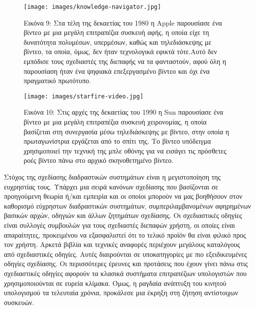 \documentclass[
]{article}
\begin{document}
\leavevmode{}%
\begin{figure}
\hypertarget{fig:knowledge-navigator}{%
\centering
\texttt{[image: images/knowledge-navigator.jpg]}
\caption{Εικόνα 9: Στα τέλη της δεκαετίας του 1980 η Apple παρουσίασε
ένα βίντεο με μια μεγάλη επιτραπέζια συσκευή αφής, η οποία είχε τη
δυνατότητα πολυμέσων, υπερμέσων, καθώς και τηλεδιάσκεψης με βίντεο, τα
οποία, όμως, δεν ήταν τεχνολογικά εφικτά τότε.Αυτό δεν εμπόδισε τους
σχεδιαστές της διεπαφής να τα φανταστούν, αφού όλη η παρουσίαση ήταν ένα
ψηφιακά επεξεργασμένο βίντεο και όχι ένα πραγματικό
πρωτότυπο.}\label{fig:knowledge-navigator}
}
\end{figure}

\leavevmode{}%
\begin{figure}
\hypertarget{fig:starfire-video}{%
\centering
\texttt{[image: images/starfire-video.jpg]}
\caption{Εικόνα 10: Στις αρχές της δεκαετίας του 1990 η Sun παρουσίασε
ένα βίντεο με μια μεγάλη επιτραπέζια συσκευή χειρονομίας, η οποία
βασίζεται στη συνεργασία μέσω τηλεδιάσκεψης με βίντεο, στην οποία η
πρωταγωνίστρια εργάζεται από το σπίτι της. Το βίντεο υπόδειγμα
χρησιμοποιεί την τεχνική της μπλε οθόνης για να εισάγει τις πρόσθετες
ροές βίντεο πάνω στο αρχικό σκηνοθετημένο
βίντεο.}\label{fig:starfire-video}
}
\end{figure}

Στόχος της σχεδίασης διαδραστικών συστημάτων είναι η μεγιστοποίηση της
ευχρηστίας τους. Υπάρχει μια σειρά κανόνων σχεδίασης που βασίζονται σε
προηγούμενη θεωρία ή/και εμπειρία και οι οποίοι μπορούν να μας βοηθήσουν
στον καθορισμό εύχρηστων διαδραστικών συστημάτων, συμπεριλαμβανομένων
αφηρημένων βασικών αρχών, οδηγιών και άλλων ζητημάτων σχεδίασης. Οι
σχεδιαστικές οδηγίες είναι συλλογές συμβουλών για τους σχεδιαστές
διεπαφών χρήστη, οι οποίες είναι απαραίτητες, προκειμένου να
εξασφαλιστεί ότι το τελικό προϊόν θα είναι φιλικό προς τον χρήστη.
Αρκετά βιβλία και τεχνικές αναφορές περιέχουν μεγάλους καταλόγους από
σχεδιαστικές οδηγίες. Αυτές διαιρούνται σε υποκατηγορίες με πιο
εξειδικευμένες οδηγίες σχεδίασης. Οι περισσότερες έρευνες και προτάσεις
που έχουν γίνει πάνω στις σχεδιαστικές οδηγίες αφορούν τα κλασικά
συστήματα επιτραπέζιων υπολογιστών που χρησιμοποιούνται σε ευρεία
κλίμακα. Όμως, η ραγδαία ανάπτυξη του κινητού υπολογισμού τα τελευταία
χρόνια, προκάλεσε μια έκρηξη στη ζήτηση αντίστοιχων συσκευών.
\end{document}
